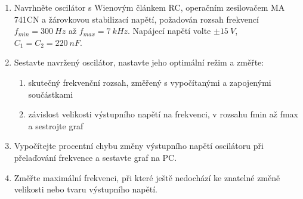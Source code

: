 \begin{minipage}[H][11.48cm][c]{0.8\textwidth}
	\begin{enumerate}
		\item
			Navrhněte oscilátor s Wienovým článkem RC, operačním zesilovačem MA 741CN a žárovkovou stabilizací napětí, požadován rozsah frekvencí $f_{min} = 300~Hz$ až $f_{max} = 7~kHz$. Napájecí napětí volte $\pm 15~V$, $C_1 = C_2 = 220~nF$.
		\item
			Sestavte navržený oscilátor, nastavte jeho optimální režim a změřte:
			\begin{enumerate}
				\item        
					skutečný frekvenční rozsah, změřený s vypočítanými a zapojenými součástkami
				\item
					závislost velikosti výstupního napětí na frekvenci, v rozsahu fmin až fmax a sestrojte graf
			\end{enumerate}                
		\item
			Vypočítejte procentní chybu změny výstupního napětí oscilátoru při přelaďování frekvence a sestavte graf na PC.
		\item
			Změřte maximální frekvenci, při které ještě nedochází ke znatelné změně velikosti nebo tvaru výstupního napětí.     
	\end{enumerate}
\end{minipage}


